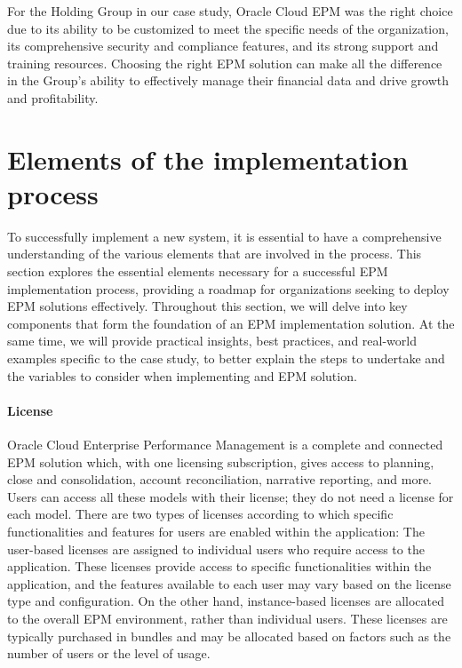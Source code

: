 \documentclass[12pt,a4paper,openright,twoside]{book}
\begin{document}
For the Holding Group in our case study, Oracle Cloud EPM was the right choice due to its ability to be customized to meet the specific needs of the organization, its comprehensive security and compliance features, and its strong support and training resources.
%
Choosing the right EPM solution can make all the difference in the Group's ability to effectively manage their financial data and drive growth and profitability.

\section{Elements of the implementation process}

To successfully implement a new system, it is essential to have a comprehensive understanding of the various elements that are involved in the process. 
%
This section explores the essential elements necessary for a successful EPM implementation process, providing a roadmap for organizations seeking to deploy EPM solutions effectively.
%
Throughout this section, we will delve into key components that form the foundation of an EPM implementation solution. 
%
At the same time, we will provide practical insights, best practices, and real-world examples specific to the case study, to better explain the steps to undertake and the variables to consider when implementing and EPM solution.

\paragraph{License}

Oracle Cloud Enterprise Performance Management is a complete and connected EPM solution which, with one licensing subscription, gives access to planning, close and consolidation, account reconciliation, narrative reporting, and more.
%
Users can access all these models with their license; they do not need a license for each model.
%
There are two types of licenses according to which specific functionalities and features for users are enabled within the application:
%
The user-based licenses are assigned to individual users who require access to the application.
%
These licenses provide access to specific functionalities within the application, and the features available to each user may vary based on the license type and configuration.
%
On the other hand, instance-based licenses are allocated to the overall EPM environment, rather than individual users. 
%
These licenses are typically purchased in bundles and may be allocated based on factors such as the number of users or the level of usage.
\end{document}
